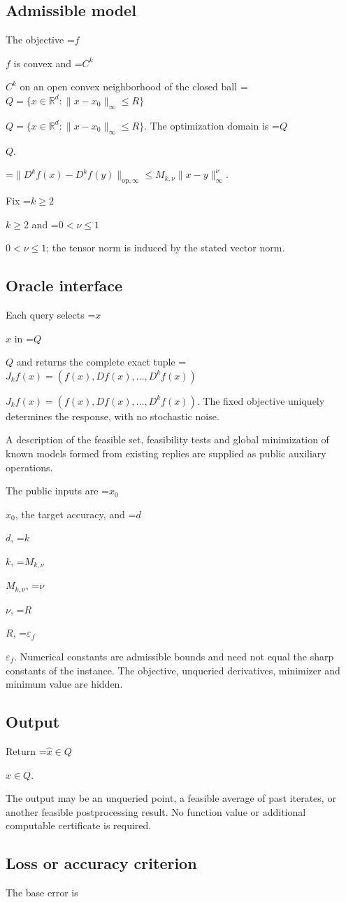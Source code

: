 \documentclass[10pt,a4paper]{article}
\newcommand{\AtlasMath}[1]{\par\begingroup\centering\setbox0=\hbox{$\displaystyle #1$}\ifdim\wd0>1.4\linewidth\typeout{ATLAS WIDE FORMULA: \the\wd0}\fi\ifdim\wd0>\linewidth\resizebox{\linewidth}{!}{\box0}\else\box0\fi\par\endgroup}
\newcommand{\AtlasInlineMath}[1]{\begingroup\setbox0=\hbox{$#1$}\ifdim\wd0>.4\linewidth\endgroup\AtlasMath{#1}\else\endgroup$#1$\fi}
\begin{document}
\subsection{Admissible model}
The objective \AtlasInlineMath{f} is convex and \AtlasInlineMath{C^k} on an open convex neighborhood of the closed ball \AtlasInlineMath{Q=\{x\in\mathbb{R}^d:\|x-x_0\|_{\infty}\le R\}}. The optimization domain is \AtlasInlineMath{Q}.


\AtlasMath{\|D^{k}f(x)-D^{k}f(y)\|_{\mathrm{op},\infty}\le M_{k,\nu}\|x-y\|_{\infty}^{\nu}.}


Fix \AtlasInlineMath{k\ge2} and \AtlasInlineMath{0<\nu\le1}; the tensor norm is induced by the stated vector norm.

\subsection{Oracle interface}
Each query selects \AtlasInlineMath{x} in \AtlasInlineMath{Q} and returns the complete exact tuple \AtlasInlineMath{J_{k}f(x)=(f(x),Df(x),\ldots,D^{k}f(x))}. The fixed objective uniquely determines the response, with no stochastic noise.

A description of the feasible set, feasibility tests and global minimization of known models formed from existing replies are supplied as public auxiliary operations.

The public inputs are \AtlasInlineMath{x_0}, the target accuracy, and \AtlasInlineMath{d}, \AtlasInlineMath{k}, \AtlasInlineMath{M_{k,\nu}}, \AtlasInlineMath{\nu}, \AtlasInlineMath{R}, \AtlasInlineMath{\varepsilon_f}. Numerical constants are admissible bounds and need not equal the sharp constants of the instance. The objective, unqueried derivatives, minimizer and minimum value are hidden.

\subsection{Output}
Return \AtlasInlineMath{\widehat{x}\in Q}.

The output may be an unqueried point, a feasible average of past iterates, or another feasible postprocessing result. No function value or additional computable certificate is required.

\subsection{Loss or accuracy criterion}
The base error is
\end{document}
